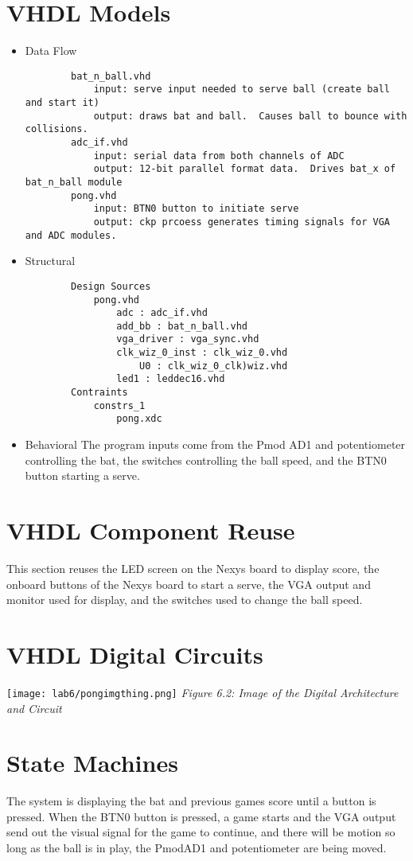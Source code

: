 \section{VHDL Models}
\begin{itemize}
    \item Data Flow
    \begin{verbatim}
        bat_n_ball.vhd
            input: serve input needed to serve ball (create ball and start it)
            output: draws bat and ball.  Causes ball to bounce with collisions. 
        adc_if.vhd
            input: serial data from both channels of ADC
            output: 12-bit parallel format data.  Drives bat_x of bat_n_ball module
        pong.vhd
            input: BTN0 button to initiate serve
            output: ckp prcoess generates timing signals for VGA and ADC modules.  
    \end{verbatim}
    \item Structural
        \begin {verbatim}
        Design Sources
            pong.vhd
                adc : adc_if.vhd
                add_bb : bat_n_ball.vhd
                vga_driver : vga_sync.vhd
                clk_wiz_0_inst : clk_wiz_0.vhd
                    U0 : clk_wiz_0_clk)wiz.vhd
                led1 : leddec16.vhd
        Contraints
            constrs_1
                pong.xdc
        \end{verbatim}
    \item Behavioral
        The program inputs come from the Pmod AD1 and potentiometer controlling the bat, the switches controlling the ball speed, and the BTN0 button starting a serve.
\end{itemize}
\section{VHDL Component Reuse}
    This section reuses the LED screen on the Nexys board to display score, the onboard buttons of the Nexys board to start a serve, the VGA output and monitor used for display, and the switches used to change the ball speed.
\section{VHDL Digital Circuits}
    \texttt{[image: lab6/pongimgthing.png]}
    \emph{Figure 6.2: Image of the Digital Architecture and Circuit}
\section{State Machines}
    The system is displaying the bat and previous games score until a button is pressed.  When the BTN0 button is pressed, a game starts and the VGA output send out the visual signal for the game to continue, and there will be motion so long as the ball is in play, the PmodAD1 and potentiometer are being moved.
